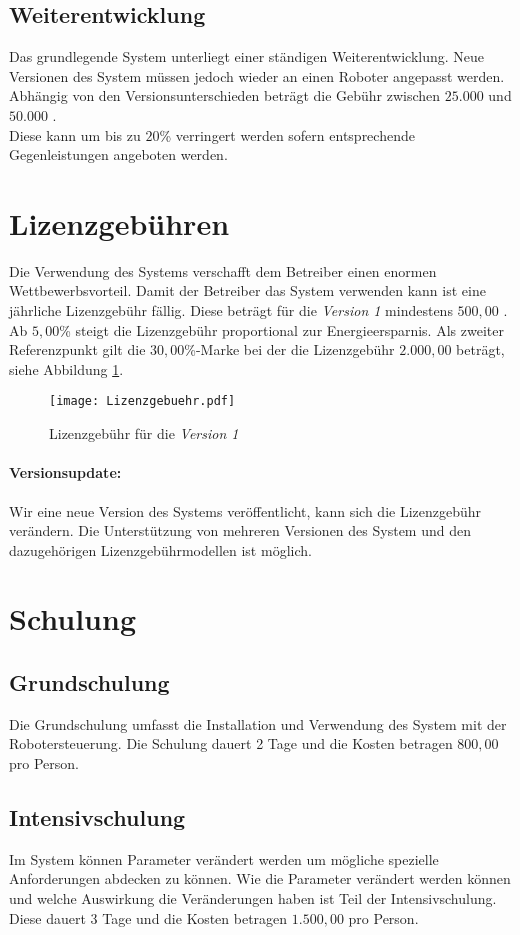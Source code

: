 \subsection{Weiterentwicklung}
Das grundlegende System unterliegt einer ständigen Weiterentwicklung. Neue Versionen des System müssen jedoch wieder an einen Roboter angepasst werden. Abhängig von den Versionsunterschieden beträgt die Gebühr zwischen $25.000$ und $50.000$ \officialeuro.\\
Diese kann um bis zu $20$\% verringert werden sofern entsprechende Gegenleistungen angeboten werden.

\section{Lizenzgebühren}
Die Verwendung des Systems verschafft dem Betreiber einen enormen Wettbewerbsvorteil. Damit der Betreiber das System verwenden kann ist eine jährliche Lizenzgebühr fällig. Diese beträgt für die \textit{Version 1} mindestens $500,00$ \officialeuro. Ab $5,00$\% steigt die Lizenzgebühr proportional zur Energieersparnis. Als zweiter Referenzpunkt gilt die $30,00$\%-Marke bei der die Lizenzgebühr $2.000,00$ \officialeuro beträgt, siehe Abbildung \ref{fig:lizenzgebuehr}.
\begin{figure}[h]
	\centering
	\texttt{[image: Lizenzgebuehr.pdf]}
	\caption{Lizenzgebühr für die \textit{Version 1}}
	\label{fig:lizenzgebuehr}
\end{figure}

\paragraph*{Versionsupdate:}
Wir eine neue Version des Systems veröffentlicht, kann sich die Lizenzgebühr verändern. Die Unterstützung von mehreren Versionen des System und den dazugehörigen Lizenzgebührmodellen ist möglich.

\section{Schulung}
\subsection{Grundschulung}
Die Grundschulung umfasst die Installation und Verwendung des System mit der Robotersteuerung. Die Schulung dauert 2 Tage und die Kosten betragen $800,00$ \officialeuro pro Person.

\subsection{Intensivschulung}
Im System können Parameter verändert werden um mögliche spezielle Anforderungen abdecken zu können. Wie die Parameter verändert werden können und welche Auswirkung die Veränderungen haben ist Teil der Intensivschulung. Diese dauert 3 Tage und die Kosten betragen $1.500,00$ \officialeuro pro Person.